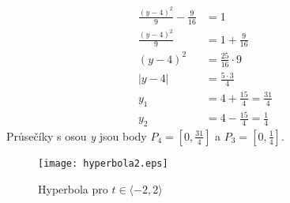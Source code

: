 \begin{enumerate}
\begin{align*}
				      	\frac{(y-4)^2}{9}-\frac{9}{16} & = 1                               \\
				      	\frac{(y-4)^2}{9}              & = 1+\frac{9}{16}                  \\
				      	(y-4)^2                        & = \frac{25}{16}\cdot 9            \\
				      	|y-4|                          & = \frac{5\cdot3}{4}               \\
				      	y_1                            & = 4 + \frac{15}{4} = \frac{31}{4} \\
				      	y_2                            & = 4 - \frac{15}{4} = \frac{1}{4}  
				      \end{align*}
				      Průsečíky s osou \textit{y} jsou body $P_4=\left[0, \frac{31}{4}\right]$ a $P_3=\left[0, \frac{1}{4}\right]$.
			\end{enumerate}
			\vfill
			\begin{figure}[H]
				\centering
				\texttt{[image: hyperbola2.eps]}
				\caption{Hyperbola pro $t \in \langle-2, 2\rangle$}
									
			\end{figure}